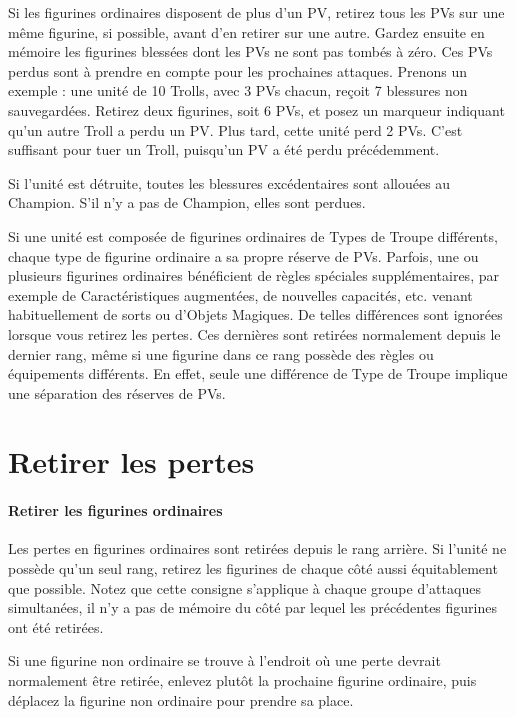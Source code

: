 Si les figurines ordinaires disposent de plus d'un PV, retirez tous les PVs sur une même figurine, si possible, avant d'en retirer sur une autre. Gardez ensuite en mémoire les figurines blessées dont les PVs ne sont pas tombés à zéro. Ces PVs perdus sont à prendre en compte pour les prochaines attaques. Prenons un exemple : une unité de 10 Trolls, avec 3 PVs chacun, reçoit 7 blessures non sauvegardées. Retirez deux figurines, soit 6 PVs, et posez un marqueur indiquant qu'un autre Troll a perdu un PV. Plus tard, cette unité perd 2 PVs. C'est suffisant pour tuer un Troll, puisqu'un PV a été perdu précédemment. 

Si l'unité est détruite, toutes les blessures excédentaires sont allouées au Champion. S'il n'y a pas de Champion, elles sont perdues.

Si une unité est composée de figurines ordinaires de Types de Troupe différents, chaque type de figurine ordinaire a sa propre réserve de PVs. Parfois, une ou plusieurs figurines ordinaires bénéficient de règles spéciales supplémentaires, par exemple de Caractéristiques augmentées, de nouvelles capacités, etc. venant habituellement de sorts ou d'Objets Magiques. De telles différences sont ignorées lorsque vous retirez les pertes. Ces dernières sont retirées normalement depuis le dernier rang, même si une figurine dans ce rang possède des règles ou équipements différents. En effet, seule une différence de Type de Troupe implique une séparation des réserves de PVs. 

\newpage
\hypertarget{removecasualties}{\section{Retirer les pertes}}

\paragraph{Retirer les figurines ordinaires}

Les pertes en figurines ordinaires sont retirées depuis le rang arrière. Si l'unité ne possède qu'un seul rang, retirez les figurines de chaque côté aussi équitablement que possible. Notez que cette consigne s'applique à chaque groupe d'attaques simultanées, il n'y a pas de \og mémoire \fg{} du côté par lequel les précédentes figurines ont été retirées.

Si une figurine non ordinaire se trouve à l'endroit où une perte devrait normalement être retirée, enlevez plutôt la prochaine figurine ordinaire, puis déplacez la figurine non ordinaire pour prendre sa place.

